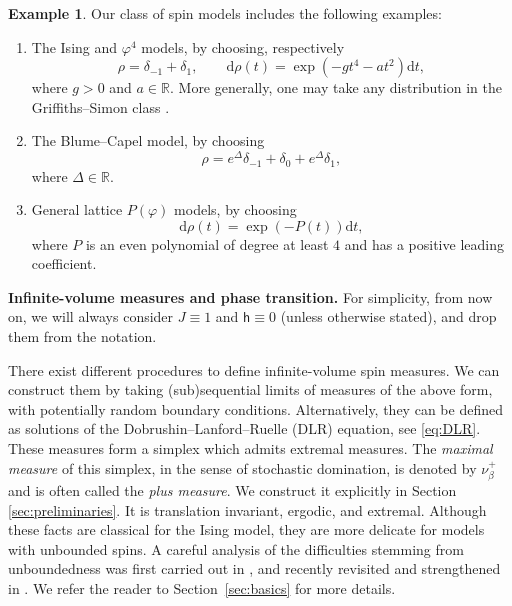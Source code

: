 \documentclass[11pt,a4paper]{article}
\numberwithin{equation}{section}
\theoremstyle{plain}
\theoremstyle{definition}
\newtheorem{Ex}[Thm]{Example}
\begin{document}
\begin{Ex} Our class of spin models includes the following examples:
\begin{enumerate}
    \item[$\bullet$] The Ising and $\varphi^4$ models, by choosing, respectively
    \begin{equation}
        \rho=\delta_{-1}+\delta_1, \qquad \mathrm{d}\rho(t)=\exp(-gt^4-at^2)\mathrm{d}t,
    \end{equation}
where $g>0$ and $a\in \mathbb R$. More generally, one may take any distribution in the Griffiths--Simon class \cite{GriffithsSimon}.
    \item[$\bullet$] The Blume--Capel model, by choosing
    \begin{equation}
        \rho=e^{\Delta}\delta_{-1}+\delta_0+e^{\Delta}\delta_1,
    \end{equation}
    where $\Delta\in \mathbb R$. 
    \item[$\bullet$] General lattice $P(\varphi)$ models, by choosing
    \begin{equation}\label{eq:equation p(phi)}
    \mathrm{d}\rho(t)=\exp(-P(t))\mathrm{d}t,
    \end{equation}
    where $P$ is an even polynomial of degree at least $4$ and has a positive leading coefficient.  
\end{enumerate}
\end{Ex}

\hfill

\noindent \textbf{Infinite-volume measures and phase transition.} For simplicity, from now on, we will always consider $J\equiv1$ and $\mathsf{h}\equiv 0$ (unless otherwise stated), and drop them from the notation. 

There exist different procedures to define infinite-volume spin measures. We can construct them by taking (sub)sequential limits of measures of the above form, with potentially random boundary conditions. Alternatively, they can be defined as solutions of the Dobrushin--Lanford--Ruelle (DLR) equation, see \eqref{eq:DLR}. These measures form a simplex which admits extremal measures. The \emph{maximal measure} of this simplex, in the sense of stochastic domination, is denoted by $\nu^+_\beta$ and is often called the \emph{plus measure}. We construct it explicitly in Section \ref{sec:preliminaries}. It is translation invariant, ergodic, and extremal. Although these facts are classical for the Ising model, they are more delicate for models with unbounded spins. A careful analysis of the difficulties stemming from unboundedness was first carried out in \cite{LebowitzPresutti1976}, and recently revisited and strengthened in \cite{PV26}. We refer the reader to Section~\ref{sec:basics} for more details. 
\end{document}
